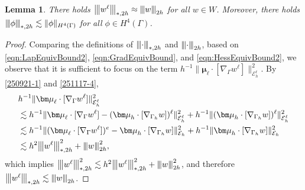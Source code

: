 \documentclass[10pt, a4paper]{amsart}
\newcommand{\nab}{\nabla}
\newcommand{\bmu}{{\bm \mu}}
\newcommand{\calE}{\mathcal{E}}
\newtheorem{lemma}[theorem]{Lemma}
\theoremstyle{definition}
\theoremstyle{remark}
\theoremstyle{example}
\numberwithin{equation}{section}
\newcommand{\tbar}[1]{{\left\vert\kern-0.25ex\left\vert\kern-0.25ex\left\vert #1 
    \right\vert\kern-0.25ex\right\vert\kern-0.25ex\right\vert}}
\begin{document}
\begin{lemma} \label{251116-1}
There holds $\tbar{w^\ell}_{*,2h} \approx \tbar{w}_{2h}$ for all $w\in W$.
Moreover, there holds $\tbar{\phi}_{*,2h}\lesssim \|\phi\|_{H^4(\Gamma)}$ for all $\phi\in H^4(\Gamma)$.
\end{lemma}
\begin{proof}
Comparing the definitions of $\tbar{\cdot}_{*, 2h}$ and $\tbar{\cdot}_{2h}$, based on \eqref{eqn:LapEquivBound2}, \eqref{eqn:GradEquivBound}, and \eqref{eqn:HessEquivBound2}, we observe that it is sufficient to focus on the term $h^{-1}\|\bmu_{\ell} \cdot [\nab_{\Gamma}w^\ell]\|_{\calE^\ell_h}^2$. By \eqref{250921-1} and \eqref{251117-4},
\begin{align*}
& h^{-1}\|\bmu_{\ell} \cdot [\nab_{\Gamma}w^\ell]\|_{\calE^\ell_h}^2 \\
& \lesssim h^{-1}\|\bmu_{\ell} \cdot [\nab_{\Gamma}w^\ell] - (\bmu_h \cdot [\nab_{\Gamma_h}w])^\ell\|_{\calE^\ell_h}^2 + h^{-1}\|(\bmu_h \cdot [\nab_{\Gamma_h}w])^\ell\|_{\calE^\ell_h}^2 \\
& \lesssim h^{-1}\|(\bmu_{\ell} \cdot [\nab_{\Gamma}w^\ell])^e - \bmu_h \cdot [\nab_{\Gamma_h}w]\|_{\calE_h}^2 + h^{-1}\|\bmu_h \cdot [\nab_{\Gamma_h}w]\|_{\calE_h}^2 \\
& \lesssim h^2\tbar{w^\ell}_{*, 2h}^2 + \tbar{w}_{2h}^2,
\end{align*}
which implies $\tbar{w^\ell}_{*, 2h}^2 \lesssim h^2\tbar{w^\ell}_{*, 2h}^2 + \tbar{w}_{2h}^2$, and therefore $\tbar{w^\ell}_{*, 2h} \lesssim \tbar{w}_{2h}$.



\end{proof}
\end{document}
